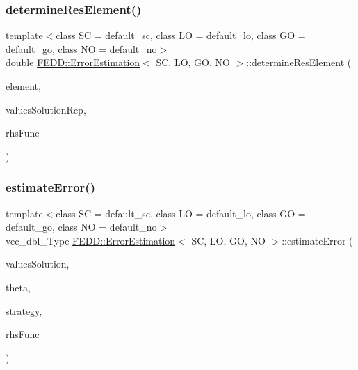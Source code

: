 \mbox{\label{classFEDD_1_1ErrorEstimation_a95684084f42e2987bb417fc889e4af97}} 
\subsubsection{\texorpdfstring{determine\+Res\+Element()}{determineResElement()}}
{\footnotesize\ttfamily template$<$class SC  = default\+\_\+sc, class LO  = default\+\_\+lo, class GO  = default\+\_\+go, class NO  = default\+\_\+no$>$ \\
double \hyperlink{classFEDD_1_1ErrorEstimation}{F\+E\+D\+D\+::\+Error\+Estimation}$<$ SC, LO, GO, NO $>$\+::determine\+Res\+Element (\begin{DoxyParamCaption}\item[{Finite\+Element\+New}]{element,  }\item[{Teuchos\+::\+Array\+R\+CP$<$ SC $>$}]{values\+Solution\+Rep,  }\item[{Rhs\+Func\+\_\+\+Type}]{rhs\+Func }\end{DoxyParamCaption})}

\mbox{\label{classFEDD_1_1ErrorEstimation_ad52aca4bc5ce267ce11bda117f218750}} 
\subsubsection{\texorpdfstring{estimate\+Error()}{estimateError()}}
{\footnotesize\ttfamily template$<$class SC  = default\+\_\+sc, class LO  = default\+\_\+lo, class GO  = default\+\_\+go, class NO  = default\+\_\+no$>$ \\
vec\+\_\+dbl\+\_\+\+Type \hyperlink{classFEDD_1_1ErrorEstimation}{F\+E\+D\+D\+::\+Error\+Estimation}$<$ SC, LO, GO, NO $>$\+::estimate\+Error (\begin{DoxyParamCaption}\item[{\hyperlink{classFEDD_1_1ErrorEstimation_af61aa23cb14996e497a1176d8fea650d}{Multi\+Vector\+Ptr\+Const\+\_\+\+Type}}]{values\+Solution,  }\item[{double}]{theta,  }\item[{string}]{strategy,  }\item[{Rhs\+Func\+\_\+\+Type}]{rhs\+Func }\end{DoxyParamCaption})}

